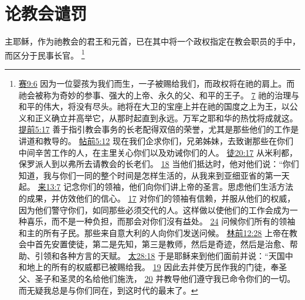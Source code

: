 \documentclass[12pt, a4paper, oneside]{ctexart}
\newcounter{parnum}[section]
\newcommand{\N}{%
   \noindent\refstepcounter{parnum}%
    \makebox[\parindent][l]{\textbf{\arabic{parnum}.}}}
\begin{document}
\section{论教会谴罚}

\N 主耶稣，作为祂教会的君王和元首，已在其中将一个政权指定在教会职员的手中，而区分于民事长官。
	\footnote {
		\href{https://biblehub.com/isaiah/9-6.htm}{赛9:6} 因为一位婴孩为我们而生，一子被赐给我们，而政权将在祂的肩上。而祂会被称为奇妙的参事、强大的上帝、永久的父、和平的王子。
		\href{https://biblehub.com/isaiah/9-7.htm}{7} 祂的治理与和平的伟大，将没有尽头。祂将在大卫的宝座上并在祂的国度之上为王，以公义和正义确立并高举它，从那时起直到永远。万军之耶和华的热忱将成就这。
		\href{https://biblehub.com/1_timothy/5-17.htm}{提前5:17} 善于指引教会事务的长老配得双倍的荣誉，尤其是那些他们的工作是讲道和教导的。
		\href{https://biblehub.com/1_thessalonians/5-12.htm}{帖前5:12} 现在我们企求你们，兄弟姊妹，去致谢那些在你们中间辛苦工作的人，在主里关心你们以及劝诫你们的人。
		\href{https://biblehub.com/acts/20-17.htm}{徒20:17} 从米利都，保罗派人到以弗所去请教会的长老们。
		\href{https://biblehub.com/acts/20-18.htm}{18} 当他们抵达时，他对他们说：“你们知道，我与你们一同的整个时间是怎样生活的，从我来到亚细亚省的第一天起。
		\href{https://biblehub.com/hebrews/13-7.htm}{来13:7} 记念你们的领袖，他们向你们讲上帝的圣言。思虑他们生活方法的成果，并仿效他们的信心。
		\href{https://biblehub.com/hebrews/13-17.htm}{17} 对你们的领袖有信赖，并服从他们的权威，因为他们警守你们，如同那些必须交代的人。这样做以使他们的工作会成为一种喜乐，而不是一种负担，而那会对你们沒有益处。
		\href{https://biblehub.com/hebrews/13-24.htm}{24} 问候你们所有的领袖和主的所有子民。那些来自意大利的人向你们发送问候。
		\href{https://biblehub.com/1_corinthians/12-28.htm}{林前12:28} 上帝在教会中首先安置使徒，第二是先知，第三是教师，然后是奇迹，然后是治愈、帮助、引领和各种方言的天赋。
		\href{https://biblehub.com/matthew/28-18.htm}{太28:18} 于是耶稣来到他们面前并说：“天国中和地上的所有的权威都已被赐给我。
		\href{https://biblehub.com/matthew/28-19.htm}{19} 因此去并使万民作我的门徒，奉圣父、圣子和圣灵的名给他们施洗，
		\href{https://biblehub.com/matthew/28-20.htm}{20} 并教导他们遵守我已命令你们的一切。而无疑我总是与你们同在，到这时代的最末了。
	}
\end{document}
